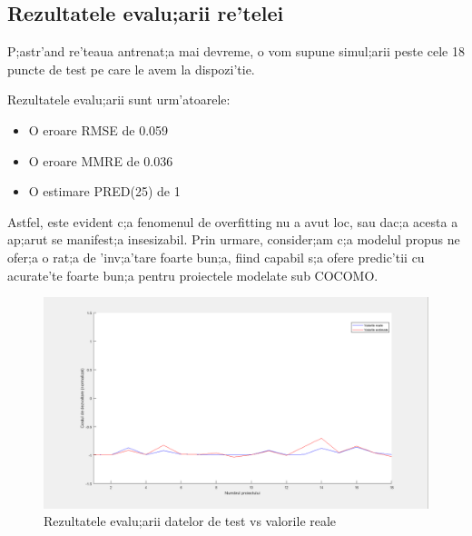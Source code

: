 \subsection{Rezultatele evalu;arii re'telei}
P;astr'and re'teaua antrenat;a mai devreme, o vom supune simul;arii peste cele 18 puncte de test pe care le avem la dispozi'tie. 
\par
Rezultatele evalu;arii sunt urm'atoarele:
\begin{itemize}
\item O eroare RMSE de 0.059
\item O eroare MMRE de 0.036
\item O estimare PRED(25) de 1
\end{itemize}
Astfel, este evident c;a fenomenul de overfitting nu a avut loc, sau dac;a acesta a ap;arut se manifest;a insesizabil. Prin urmare, consider;am c;a modelul propus ne ofer;a o rat;a de 'inv;a'tare foarte bun;a, fiind capabil s;a ofere predic'tii cu acurate'te foarte bun;a pentru proiectele modelate sub COCOMO.
\newpage
\begin{figure}[!htbp]
\includegraphics[width=\textwidth]{testing_output}
\caption {Rezultatele evalu;arii datelor de test vs valorile reale}
\end{figure}